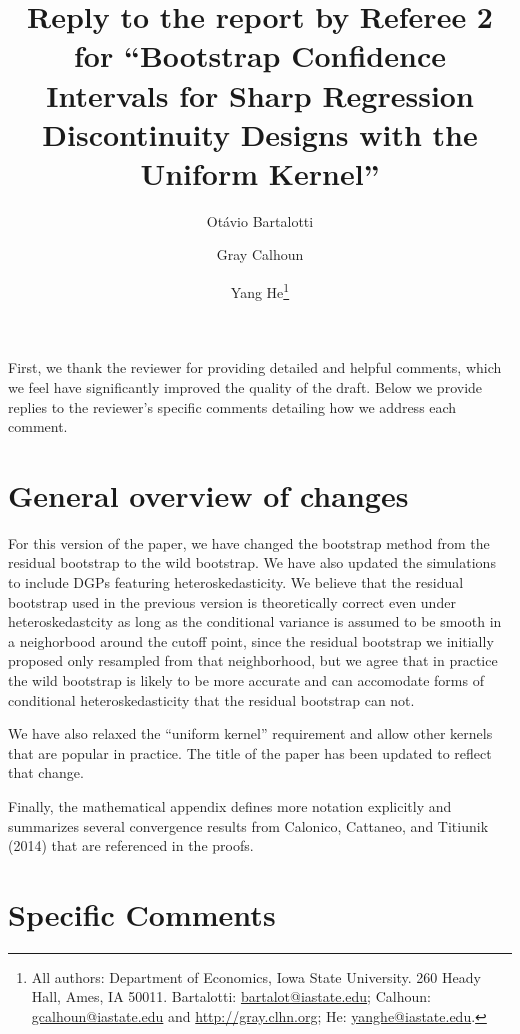 \documentclass[12pt,fleqn]{article}
\title{Reply to the report by Referee 2 for ``Bootstrap Confidence Intervals for Sharp Regression Discontinuity Designs
  with the Uniform Kernel''}
\author{Ot\'avio Bartalotti \and Gray Calhoun \and Yang He\thanks{%
  All authors: Department of Economics, Iowa State University.
  260 Heady Hall, Ames, IA 50011.
  Bartalotti: \protect\url{bartalot@iastate.edu};
  Calhoun: \protect\url{gcalhoun@iastate.edu} and
  \protect\url{http://gray.clhn.org};
  He: \protect\url{yanghe@iastate.edu}.}}
\begin{document}
\maketitle

First, we thank the reviewer for providing detailed and helpful comments, which
we feel have significantly improved the quality of the draft.  Below we provide
replies to the reviewer's specific comments detailing how we address each
comment.

\section{General overview of changes}

For this version of the paper, we have changed the bootstrap method from the
residual bootstrap to the wild bootstrap. We have also updated the simulations
to include DGPs featuring heteroskedasticity. We believe that the residual
bootstrap used in the previous version is theoretically correct even under
heteroskedastcity as long as the conditional variance is assumed to be smooth in
a neighorbood around the cutoff point, since the residual bootstrap we initially
proposed only resampled from that neighborhood, but we agree that in practice
the wild bootstrap is likely to be more accurate and can accomodate forms of
conditional heteroskedasticity that the residual bootstrap can not.

We have also relaxed the ``uniform kernel'' requirement and allow other kernels
that are popular in practice. The title of the paper has been updated to reflect
that change.

Finally, the mathematical appendix defines more notation explicitly and
summarizes several convergence results from Calonico, Cattaneo, and Titiunik
(2014) that are referenced in the proofs.

\section{Specific Comments}
\end{document}
